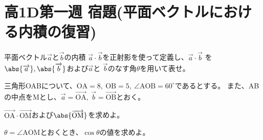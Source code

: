 \documentclass[dvipdfmx,uplatex,b5paper]{jsarticle}
\newcommand{\Vector}[1]{\overrightarrow{\text{#1}}}
\begin{document}
\section*{高1D第一週 宿題(平面ベクトルにおける内積の復習)}

\begin{enumarabicp}
  \item 平面ベクトル$\overrightarrow{a}$と$\overrightarrow{b}$の内積
  $\overrightarrow{a}\cdot \overrightarrow{b}$を正射影を使って定義し、$\overrightarrow{a}\cdot \overrightarrow{b}$
  を$\abs{\overrightarrow{a}}, \abs{\overrightarrow{b}}$および$\overrightarrow{a}$と
  $\overrightarrow{b}$のなす角$\theta$を用いて表せ。

  \item 三角形OABについて、$\text{OA}=8,\ \text{OB}=5,\ \angle\text{AOB}=60^\circ$であるとする。
  また、ABの中点をMとし、$\overrightarrow{a}=\Vector{OA},\ \overrightarrow{b}=\Vector{OB}$とおく。
  \begin{enumromanp}
    \item $\Vector{OA}\cdot \Vector{OM}$および$\abs{\Vector{OM}}$を求めよ。
    \item $\theta=\angle\text{AOM}$とおくとき、$\cos \theta$の値を求めよ。
  \end{enumromanp}
\end{enumarabicp}

\newpage
\end{document}
